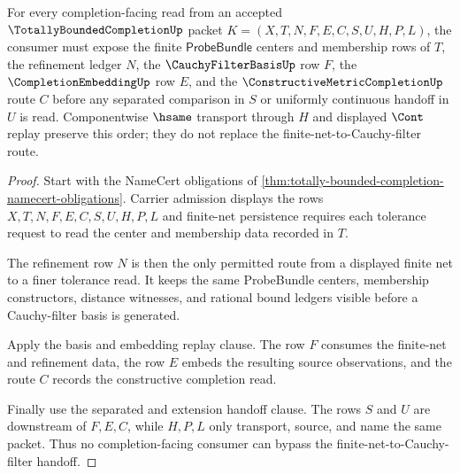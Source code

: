 \begin{theorem}
\label{thm:totally-bounded-completion-finite-net-cauchy-handoff}
For every completion-facing read from an accepted $\TotallyBoundedCompletionUp$ packet $K=(X,T,N,F,E,C,S,U,H,P,L)$, the consumer must expose the finite $\mathsf{ProbeBundle}$ centers and membership rows of $T$, the refinement ledger $N$, the $\CauchyFilterBasisUp$ row $F$, the $\CompletionEmbeddingUp$ row $E$, and the $\ConstructiveMetricCompletionUp$ route $C$ before any separated comparison in $S$ or uniformly continuous handoff in $U$ is read. Componentwise $\hsame$ transport through $H$ and displayed $\Cont$ replay preserve this order; they do not replace the finite-net-to-Cauchy-filter route.
\end{theorem}
\begin{proof}
Start with the NameCert obligations of \autoref{thm:totally-bounded-completion-namecert-obligations}. Carrier admission displays the rows $X,T,N,F,E,C,S,U,H,P,L$ and finite-net persistence requires each tolerance request to read the center and membership data recorded in $T$.

The refinement row $N$ is then the only permitted route from a displayed finite net to a finer tolerance read. It keeps the same ProbeBundle centers, membership constructors, distance witnesses, and rational bound ledgers visible before a Cauchy-filter basis is generated.

Apply the basis and embedding replay clause. The row $F$ consumes the finite-net and refinement data, the row $E$ embeds the resulting source observations, and the route $C$ records the constructive completion read.

Finally use the separated and extension handoff clause. The rows $S$ and $U$ are downstream of $F,E,C$, while $H,P,L$ only transport, source, and name the same packet. Thus no completion-facing consumer can bypass the finite-net-to-Cauchy-filter handoff.
\end{proof}


